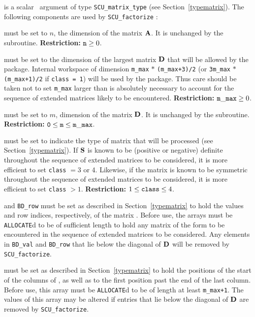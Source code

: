 \documentclass{galahad}
\newcommand{\packagename}{SCU}
\begin{document}
\vspace*{-3mm}
\begin{description}

 is a scalar \intentinout\ argument of type
{\tt \packagename\_matrix\_type}
(see Section~\ref{typematrix}).
The following components are used by {\tt \packagename\_factorize} :

\begin{description}
 must be set to $n$, the dimension of the matrix $ {\mathbf{A}}$.
It is unchanged by the subroutine. {\bf Restriction:} ${\tt n} \geq 0$.

 must be set to the
dimension of the largest matrix ${\mathbf{D}}$ that will be allowed
by the package. Internal workspace of dimension
{\tt m\_max} $\ast$ {\tt (m\_max+3)/2}
(or {\tt 3m\_max} $\ast$ {\tt (m\_max+1)/2} if {\tt class = 1})
will be used by the package. Thus care should be taken not to set {\tt m\_max}
larger than is absolutely necessary to account for the sequence of
extended matrices likely to be encountered.
{\bf Restriction:} ${\tt m\_max} \geq 0$.

 must be set to $m$, dimension of the matrix ${\mathbf{D}}$.
It is unchanged by the subroutine.
{\bf Restriction:} ${\tt 0} \leq {\tt m} \leq {\tt m\_max}$.

 must be set to indicate the type of matrix that will be
processed (see Section~\ref{typematrix}).
If ${\mathbf{S}}$ is known
to be (positive or negative) definite throughout the sequence
of extended matrices to be considered, it is more efficient to set
{\tt class} $= 3$ or 4. Likewise, if the matrix is known
to be symmetric throughout the sequence
of extended matrices to be considered, it is more efficient to set
{\tt class} $> 1$.
{\bf Restriction:} $1 \leq  {\tt class} \leq 4$.

 and {\tt BD\_row} must be set as described in
Section~\ref{typematrix}  to hold the values and row indices, respectively,
of the matrix .  Before use, the arrays must be {\tt ALLOCATE}d
to be of sufficient length to hold any matrix of the form 
to be encountered in the sequence of
extended matrices to be considered. Any elements in {\tt BD\_val} and
{\tt BD\_row}
that lie below the diagonal of ${\mathbf{D}}$ will be removed by
{\tt \packagename\_factorize}.

 must be set as described in Section~\ref{typematrix}
to hold the
positions of the start of the columns of , as well as to the first
position past the end of the last column.
Before use, this array must be {\tt ALLOCATE}d to be of length at least
{\tt m\_max+1}.
The values of this array may be altered if entries that lie
below the diagonal of ${\mathbf{D}}$ are removed by {\tt \packagename\_factorize}.


\end{description}
\end{description}
\end{document}
